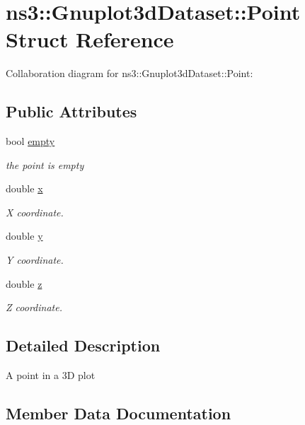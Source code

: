 \hypertarget{structns3_1_1Gnuplot3dDataset_1_1Point}{}\section{ns3\+:\+:Gnuplot3d\+Dataset\+:\+:Point Struct Reference}
\label{structns3_1_1Gnuplot3dDataset_1_1Point}


Collaboration diagram for ns3\+:\+:Gnuplot3d\+Dataset\+:\+:Point\+:
\subsection*{Public Attributes}
\begin{DoxyCompactItemize}
\item 
bool \hyperlink{structns3_1_1Gnuplot3dDataset_1_1Point_a65c0d42073aba8f1f7cb3d2546f815c9}{empty}
\begin{DoxyCompactList}\small\item\em the point is empty \end{DoxyCompactList}\item 
double \hyperlink{structns3_1_1Gnuplot3dDataset_1_1Point_a70d7da4551623eb178ebafdd22c30b68}{x}
\begin{DoxyCompactList}\small\item\em X coordinate. \end{DoxyCompactList}\item 
double \hyperlink{structns3_1_1Gnuplot3dDataset_1_1Point_ad36535d92d8d0c7df125403786befa5c}{y}
\begin{DoxyCompactList}\small\item\em Y coordinate. \end{DoxyCompactList}\item 
double \hyperlink{structns3_1_1Gnuplot3dDataset_1_1Point_ac41d68d8f36f65d100382746440ab40a}{z}
\begin{DoxyCompactList}\small\item\em Z coordinate. \end{DoxyCompactList}\end{DoxyCompactItemize}


\subsection{Detailed Description}
A point in a 3D plot 

\subsection{Member Data Documentation}
